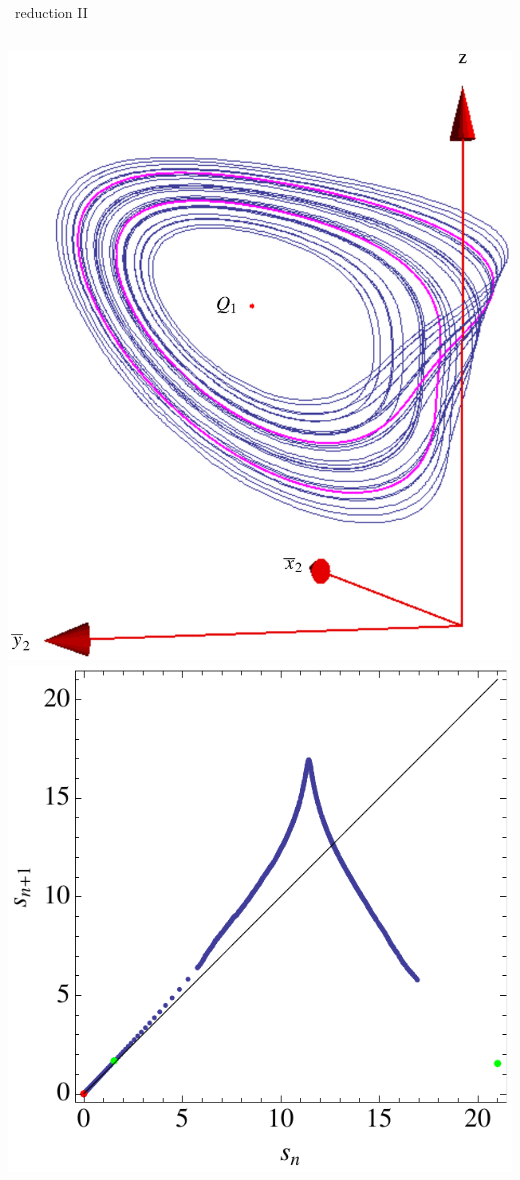 \documentclass{beamer}
\begin{document}
\begin{frame}{\CLe\ reduction II}
 \begin{columns}
	  \includegraphics[width=\textwidth]{../../figs/CLEinvXYZdefense}
	  \includegraphics[width=\textwidth]{../../figs/CLEinvRM}
 \end{columns}
\end{frame}
\end{document}
